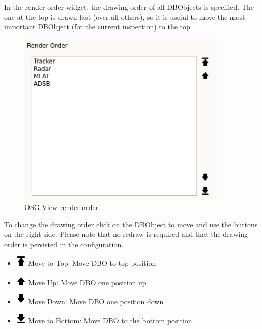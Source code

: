In the render order widget, the drawing order of all DBObjects is specified. The one at the top is drawn last (over all others), so it is useful to move the most important DBObject (for the current inspection) to the top.

\begin{figure}[H]
    \includegraphics[width=10cm,frame]{../screenshots/osgview_render_order.png}
  \caption{OSG View render order}
\end{figure}

To change the drawing order click on the DBObject to move and use the buttons on the right side. Please note that no redraw is required and that the drawing order is persisted in the configuration.
% 
 \begin{itemize}
 \item \includegraphics[width=0.5cm]{../../data/icons/top.png} Move to Top: Move DBO to top position
 \item \includegraphics[width=0.5cm]{../../data/icons/up.png} Move Up: Move DBO one position up
 \item \includegraphics[width=0.5cm]{../../data/icons/down.png} Move Down: Move DBO one position down
 \item \includegraphics[width=0.5cm]{../../data/icons/bottom.png} Move to Bottom: Move DBO to the bottom position
\end{itemize}
